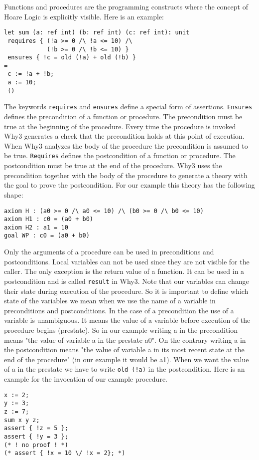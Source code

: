 Functions and procedures are the programming constructs where the concept
of Hoare Logic is explicitly visible. Here is an example:
\begin{lstlisting}
let sum (a: ref int) (b: ref int) (c: ref int): unit
 requires { (!a >= 0 /\ !a <= 10) /\ 
            (!b >= 0 /\ !b <= 10) }
 ensures { !c = old (!a) + old (!b) }
=
 c := !a + !b;
 a := 10;
 ()
\end{lstlisting}
The keywords \verb"requires" and \verb"ensures" define a special form of assertions.
\verb"Ensures" defines the precondition of a function or procedure. 
The precondition must be true at the beginning of the procedure. Every time
the procedure is invoked Why3 generates a check that the precondition
holds at this point of execution. When Why3 analyzes the body of the 
procedure the precondition is assumed to be true.
\verb"Requires" defines the postcondition of a function or procedure. The
postcondition must be true at the end of the procedure. Why3 uses the 
precondition together with the body of the procedure to generate a theory
with the goal to prove the postcondition. For our example this theory has
the following shape:
\begin{lstlisting}
axiom H : (a0 >= 0 /\ a0 <= 10) /\ (b0 >= 0 /\ b0 <= 10)
axiom H1 : c0 = (a0 + b0)
axiom H2 : a1 = 10
goal WP : c0 = (a0 + b0)
\end{lstlisting}
Only the arguments of a procedure can be used in preconditions and 
postconditions. Local variables can not be used since they are not visible
for the caller. The only exception is the return value of a function. It 
can be used in a postcondition and is called \verb"result" in Why3.
Note that our variables can change their state during execution of the 
procedure. So it is important to define which state of the variables we
mean when we use the name of a variable in preconditions and
postconditions. 
In the case of a precondition the use of a variable is unambiguous.
It means the value of a variable before execution of the procedure begins
(prestate). So in our example writing a in the precondition means 
"the value of variable a in the prestate a0".
On the contrary writing a in the postcondition means "the value of 
variable a in
its most recent state at the end of the procedure" (in our example it 
would be a1). When we want the value of a in the prestate we have to
write \verb"old (!a)" in the postcondition.
Here is an example for the invocation of our example procedure.
\begin{lstlisting}
x := 2;
y := 3;
z := 7;
sum x y z;
assert { !z = 5 };
assert { !y = 3 };
(* ! no proof ! *)
(* assert { !x = 10 \/ !x = 2}; *)
\end{lstlisting}
